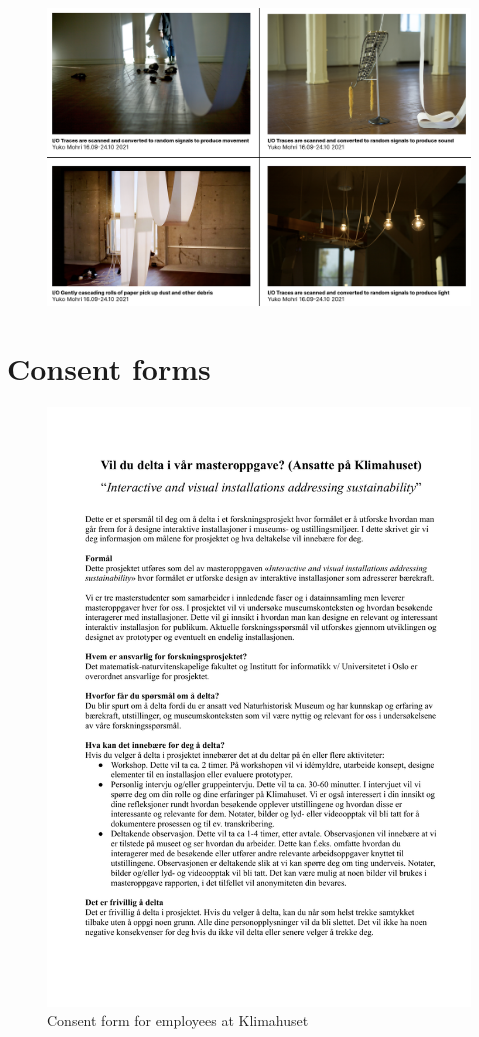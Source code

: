 \begin{figure}[H]
\includegraphics[width=13cm]{pictures/dataset/yuko_mohri.png}
\centering 
\end{figure}

\section{Consent forms}

\begin{figure}[H]
\includegraphics[width=12.5cm]{pictures/appendix/Samtykkeskjema_klimahuset.pdf}
\caption{Consent form for employees at Klimahuset}
\end{figure}

